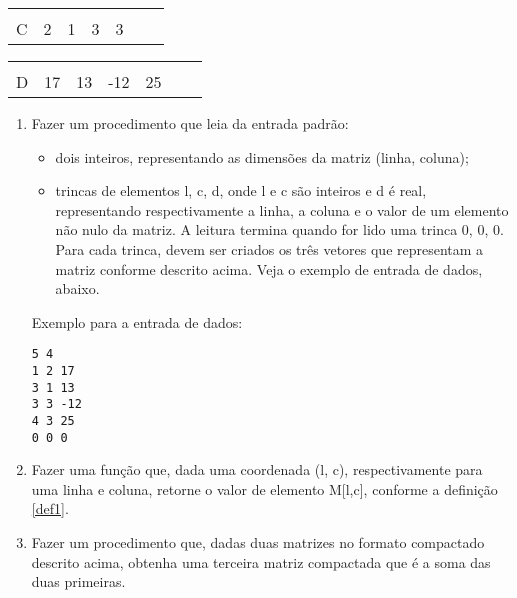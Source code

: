\begin{enumerate}
\begin{center}
\begin{tabular}{c|p{.6cm}|p{.6cm}|p{.6cm}|p{.6cm}|p{.6cm}|p{.6cm}|} 
\multicolumn{1}{c}{} & \multicolumn{1}{c}{} & \multicolumn{1}{c}{} & \multicolumn{1}{c}{} 
& \multicolumn{1}{c}{} & \multicolumn{1}{c}{} & \multicolumn{1}{c}{}\\ \cline{2-7}
C & 2  & 1  & 3   & 3 & & \\ \cline{2-7}
\end{tabular}

\begin{tabular}{c|p{.6cm}|p{.6cm}|p{.6cm}|p{.6cm}|p{.6cm}|p{.6cm}|} 
\multicolumn{1}{c}{} & \multicolumn{1}{c}{} & \multicolumn{1}{c}{} & \multicolumn{1}{c}{} 
& \multicolumn{1}{c}{} & \multicolumn{1}{c}{} & \multicolumn{1}{c}{}\\ \cline{2-7}
D & 17  & 13  & -12   & 25 & & \\ \cline{2-7}
\end{tabular}
\end{center}

\begin {enumerate}


\item Fazer um procedimento que leia da entrada padrão: 
\begin{itemize}
\item dois inteiros, representando as dimensões da matriz (linha, coluna);
\item trincas de elementos l, c, d, onde l e c são inteiros e d é real,
representando respectivamente a linha, a coluna
e o valor de um elemento não nulo da matriz. A leitura termina quando for
lido uma trinca 0, 0, 0. Para cada trinca, devem ser criados os três
vetores que representam a matriz conforme descrito acima. Veja o exemplo
de entrada de dados, abaixo.
\end{itemize}

Exemplo para a entrada de dados:

\begin{verbatim}
5 4
1 2 17
3 1 13
3 3 -12
4 3 25
0 0 0 
\end{verbatim}


\item Fazer uma função que, dada uma coordenada (l, c), respectivamente
para uma linha e coluna,
retorne o valor de elemento M[l,c], conforme a definição \ref{def1}.

\item Fazer um procedimento que,  dadas duas matrizes no formato compactado
descrito acima, obtenha uma terceira matriz compactada que é a soma
das duas primeiras. 


\end{enumerate}
\end{enumerate}
